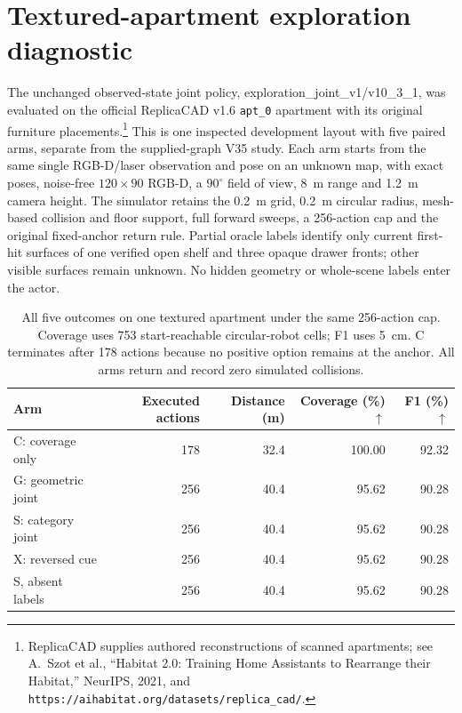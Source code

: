 \clearpage
\section{Textured-apartment exploration diagnostic}\label{sec:replicacad-diagnostic}

The unchanged observed-state joint policy, exploration\_joint\_v1/v10\_3\_1, was evaluated on the official ReplicaCAD v1.6 \texttt{apt\_0} apartment with its original furniture placements.\footnote{ReplicaCAD supplies authored reconstructions of scanned apartments; see A.~Szot et al., ``Habitat 2.0: Training Home Assistants to Rearrange their Habitat,'' NeurIPS, 2021, and \texttt{https://aihabitat.org/datasets/replica\_cad/}.} This is one inspected development layout with five paired arms, separate from the supplied-graph V35 study. Each arm starts from the same single RGB-D/laser observation and pose on an unknown map, with exact poses, noise-free $120\!\times\!90$ RGB-D, a $90^\circ$ field of view, 8~m range and 1.2~m camera height. The simulator retains the 0.2~m grid, 0.2~m circular radius, mesh-based collision and floor support, full forward sweeps, a 256-action cap and the original fixed-anchor return rule. Partial oracle labels identify only current first-hit surfaces of one verified open shelf and three opaque drawer fronts; other visible surfaces remain unknown. No hidden geometry or whole-scene labels enter the actor.

\begin{table}[!htbp]\centering\small
\caption{All five outcomes on one textured apartment under the same 256-action cap. Coverage uses 753 start-reachable circular-robot cells; F1 uses 5~cm. C terminates after 178 actions because no positive option remains at the anchor. All arms return and record zero simulated collisions.}\label{tab:s-replicacad}
\begin{tabular}{@{}lrrrr@{}}\toprule
Arm & Executed actions & Distance (m) & Coverage (\%) $\uparrow$ & F1 (\%) $\uparrow$ \\ \midrule
C: coverage only & 178 & 32.4 & 100.00 & 92.32 \\
G: geometric joint & 256 & 40.4 & 95.62 & 90.28 \\
S: category joint & 256 & 40.4 & 95.62 & 90.28 \\
X: reversed cue & 256 & 40.4 & 95.62 & 90.28 \\
S, absent labels & 256 & 40.4 & 95.62 & 90.28 \\
\bottomrule\end{tabular}\end{table}

